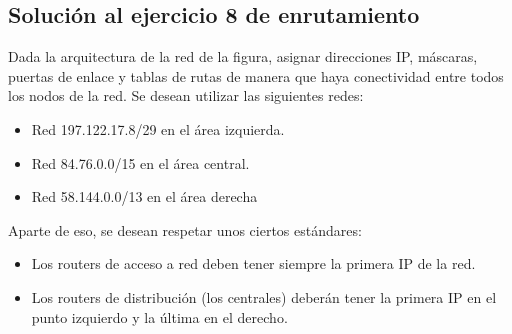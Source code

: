 \documentclass[letterpaper,10pt,spanish]{sphinxmanual}
\begin{document}
\subsection{Solución al ejercicio 8 de enrutamiento}
\label{\detokenize{t2_integracion_elementos/ejercicios_subredes_ipv4/ejercicios_dos_router:solucion-al-ejercicio-8-de-enrutamiento}}
\sphinxAtStartPar
Dada la arquitectura de la red de la figura, asignar direcciones IP, máscaras, puertas de enlace y tablas de rutas de manera que haya conectividad entre todos
los nodos de la red. Se desean utilizar las siguientes redes:
\begin{itemize}
\item {} 
\sphinxAtStartPar
Red 197.122.17.8/29 en el área izquierda.

\item {} 
\sphinxAtStartPar
Red 84.76.0.0/15 en el área central.

\item {} 
\sphinxAtStartPar
Red 58.144.0.0/13 en el área derecha

\end{itemize}

\begin{figure}[htbp]
\centering

\noindent{}
\end{figure}

\sphinxAtStartPar
Aparte de eso, se desean respetar unos ciertos estándares:
\begin{itemize}
\item {} 
\sphinxAtStartPar
Los routers de acceso a red deben tener siempre la primera IP de la red.

\item {} 
\sphinxAtStartPar
Los routers de distribución (los centrales) deberán tener la primera IP en el punto izquierdo y la última en el derecho.

\end{itemize}
\end{document}
